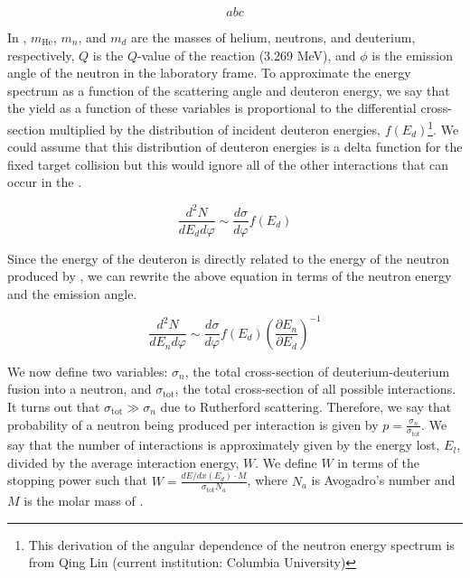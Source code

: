 \begin{equation}
        \label{eqn:nerix_neutron_energy}
        abc
\end{equation}

In , $m_{\textrm{He}}$, $m_n$, and $m_d$ are the masses of helium, neutrons, and deuterium, respectively, $Q$ is the $Q$-value of the reaction (3.269 MeV), and $\phi$ is the emission angle of the neutron in the laboratory frame.  To approximate the energy spectrum as a function of the scattering angle and deuteron energy, we say that the yield as a function of these variables is proportional to the differential cross-section multiplied by the distribution of incident deuteron energies, $f(E_d)$\footnote{This derivation of the angular dependence of the neutron energy spectrum is from Qing Lin (current institution: Columbia University)}.  We could assume that this distribution of deuteron energies is a delta function for the fixed target collision but this would ignore all of the other interactions that can occur in the \titde{}.  

\begin{equation}
        \frac{d^2 N}{d E_d d \varphi} \sim \frac{d \sigma}{d \varphi} f(E_d)
\end{equation}

Since the energy of the deuteron is directly related to the energy of the neutron produced by , we can rewrite the above equation in terms of the neutron energy and the emission angle.

\begin{equation}
        \frac{d^2 N}{d E_n d \varphi} \sim \frac{d \sigma}{d \varphi} f(E_d) \left( \frac{\partial E_n}{\partial E_d} \right)^{-1}
\end{equation}

We now define two variables: $\sigma_n$, the total cross-section of deuterium-deuterium fusion into a neutron, and $\sigma_{\textrm{tot}}$, the total cross-section of all possible interactions.  It turns out that $\sigma_{\textrm{tot}} \gg \sigma_n$ due to Rutherford scattering.  Therefore, we say that probability of a neutron being produced per interaction is given by $p = \frac{\sigma_n}{\sigma_{\textrm{tot}}}$.  We say that the number of interactions is approximately given by the energy lost, $E_l$, divided by the average interaction energy, $W$.  We define $W$ in terms of the stopping power such that $W = \frac{dE / dx(E_d) \cdot M}{\sigma_{\textrm{tot}} N_a}$, where $N_a$ is Avogadro's number and $M$ is the molar mass of \titde{}.

